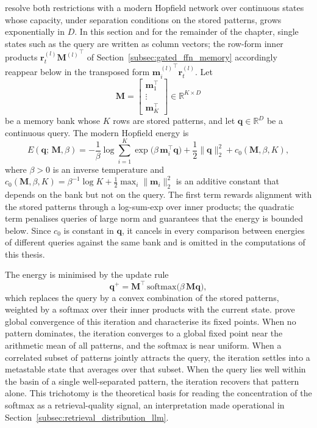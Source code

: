 \citet{ramsauer2020hopfield} resolve both restrictions with a modern Hopfield
network over continuous states whose capacity, under separation conditions on
the stored patterns, grows exponentially in $D$. In this section and for the
remainder of the chapter, single states such as the query are written as
column vectors; the row-form inner products
$\mathbf{r}_t^{(l)}{\mathbf{M}^{(l)}}^{\!\top}$ of
Section~\ref{subsec:gated_ffn_memory} accordingly reappear below in the
transposed form ${\mathbf{m}_i^{(l)}}^{\!\top}\mathbf{r}_t^{(l)}$. Let
\begin{equation}
    \mathbf{M}
    =
    \begin{bmatrix}
        \mathbf{m}_1^\top\\
        \vdots\\
        \mathbf{m}_K^\top
    \end{bmatrix}
    \in \mathbb{R}^{K \times D}
    \label{eq:generic_memory_bank}
\end{equation}
be a memory bank whose $K$ rows are stored patterns, and let
$\mathbf{q} \in \mathbb{R}^D$ be a continuous query. The modern Hopfield
energy is
\begin{equation}
    E(\mathbf{q};\,\mathbf{M},\beta)
    =
    -\frac{1}{\beta}\log\sum_{i=1}^{K}
    \exp\!\bigl(\beta\,\mathbf{m}_i^{\top}\mathbf{q}\bigr)
    +\frac{1}{2}\|\mathbf{q}\|_2^{2}
    + c_0(\mathbf{M},\beta,K),
    \label{eq:modern_hopfield_energy}
\end{equation}
where $\beta > 0$ is an inverse temperature and
$c_0(\mathbf{M},\beta,K) = \beta^{-1}\log K +
\frac{1}{2}\max_i\|\mathbf{m}_i\|_2^2$ is an additive constant that depends on
the bank but not on the query. The first term rewards alignment with the
stored patterns through a log-sum-exp over inner products; the quadratic term
penalises queries of large norm and guarantees that the energy is bounded
below. Since $c_0$ is constant in $\mathbf{q}$, it cancels in every comparison
between energies of different queries against the same bank and is omitted in
the computations of this thesis.

The energy is minimised by the update rule \citep{ramsauer2020hopfield}
\begin{equation}
    \mathbf{q}^{+}
    =
    \mathbf{M}^{\top}\,\mathrm{softmax}\!\bigl(\beta\,\mathbf{M}\mathbf{q}\bigr),
    \label{eq:modern_hopfield_update}
\end{equation}
which replaces the query by a convex combination of the stored patterns,
weighted by a softmax over their inner products with the current state.
\citet{ramsauer2020hopfield} prove global convergence of this iteration and
characterise its fixed points. When no pattern dominates, the iteration
converges to a global fixed point near the arithmetic mean of all patterns,
and the softmax is near uniform. When a correlated subset of patterns jointly
attracts the query, the iteration settles into a metastable state that
averages over that subset. When the query lies well within the basin of a
single well-separated pattern, the iteration recovers that pattern alone.
This trichotomy is the theoretical basis for reading the concentration of the
softmax as a retrieval-quality signal, an interpretation made operational in
Section~\ref{subsec:retrieval_distribution_llm}.

